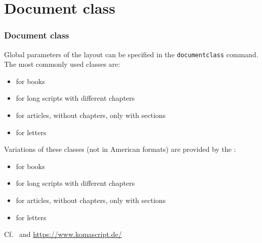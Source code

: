 \section{Document class}

\begin{frame}[fragile]
\frametitle{Document class}

Global parameters of the layout can be specified in the \lstinline|documentclass| command. The most commonly used classes are:
 
\begin{itemize}
	\item {} for books
	\item {} for long scripts with different chapters
	\item {} for articles, without chapters, only with sections
	\item {} for letters
\end{itemize}

\pause 

Variations of these classes (not in American formats) are provided by the \textbf{}:

\begin{itemize}
	\item {} for books
	\item {} for long scripts with different chapters
	\item \alert{} for articles, without chapters, only with sections
	\item {} for letters
\end{itemize}

Cf.\ \citet{Kohm&Co13a} and \url{https://www.komascript.de/}

\end{frame}


